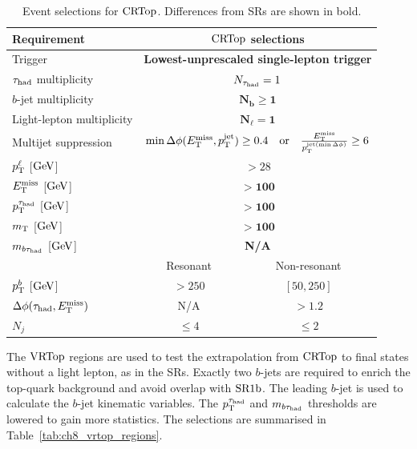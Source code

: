 \begin{table}[htbp]
    \centering
    \small
    \caption[Event selections for $\CRTop$]{Event selections for $\CRTop$. Differences from SRs are shown in bold.}
    \label{tab:ch8_top_regions}
    \begin{tabular}{lcc}
        \toprule
        Requirement & \multicolumn{2}{c}{\textbf{$\CRTop$ selections}} \\
        \midrule
        Trigger & \multicolumn{2}{c}{\textbf{Lowest-unprescaled single-lepton trigger}} \\
        $\tau_{\mathrm{had}}$ multiplicity & \multicolumn{2}{c}{$N_{\tau_{\mathrm{had}}}=1$} \\
        $b$-jet multiplicity & \multicolumn{2}{c}{$\bm{N_b\geq1}$} \\
        Light-lepton multiplicity & \multicolumn{2}{c}{$\bm{N_\ell=1}$} \\
        Multijet suppression & \multicolumn{2}{c}{$\min\Delta\phi(E_{\mathrm{T}}^{\mathrm{miss}},p_{\mathrm{T}}^{\mathrm{jet}})\geq0.4\quad\text{or}\quad\frac{E_{\mathrm{T}}^{\mathrm{miss}}}{p_{\mathrm{T}}^{\mathrm{jet}(\min{\Delta\phi)}}}\geq6$} \\
        \midrule
        $p_{\mathrm{T}}^\ell$ [$\mathrm{GeV}$] & \multicolumn{2}{c}{$>28$} \\
        $E_{\mathrm{T}}^{\mathrm{miss}}$ [$\mathrm{GeV}$] & \multicolumn{2}{c}{$\bm{>100}$} \\
        $p_{\mathrm{T}}^{\tau_{\mathrm{had}}}$ [$\mathrm{GeV}$] & \multicolumn{2}{c}{$\bm{>100}$} \\
        $m_{\mathrm{T}}$ [$\mathrm{GeV}$] & \multicolumn{2}{c}{$\bm{>100}$} \\
        $m_{b\tau_{\mathrm{had}}}$ [$\mathrm{GeV}$] & \multicolumn{2}{c}{\textbf{N/A}} \\
        \midrule
         & Resonant & Non-resonant \\
        \midrule
        $p_{\mathrm{T}}^b$ [$\mathrm{GeV}$] & $>250$ & $[50, 250]$ \\
        $\Delta\phi(\tau_{\mathrm{had}}, E_{\mathrm{T}}^{\mathrm{miss}})$ & N/A & $>1.2$ \\
        $N_j$ & $\leq4$ & $\leq2$ \\
        \bottomrule
    \end{tabular}
\end{table}

The $\mathrm{VRTop}$ regions are used to test the extrapolation from $\CRTop$ to final states without a light lepton, as in the SRs.
Exactly two $b$-jets are required to enrich the top-quark background and avoid overlap with $\mathrm{SR1b}$.
The leading $b$-jet is used to calculate the $b$-jet kinematic variables.
The $p_{\mathrm{T}}^{\tau_{\mathrm{had}}}$ and $m_{b\tau_{\mathrm{had}}}$ thresholds are lowered to gain more statistics.
The selections are summarised in Table~\ref{tab:ch8_vrtop_regions}.

